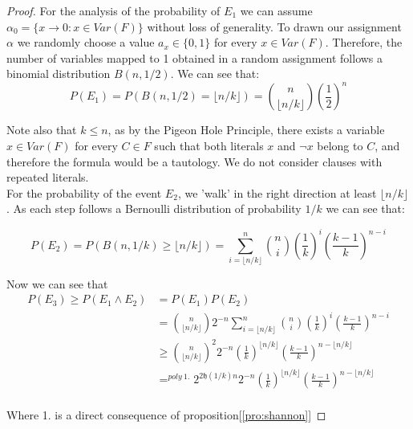 \begin{theorem}
\begin{proof}
For the analysis of the probability of $E_1$ we can assume $\alpha_0 = \{ x \to 0 : x \in Var(F)\}$ without loss of generality. To drawn our assignment $\alpha$ we randomly choose a value $a_x \in \{0,1\}$ for every $x \in Var(F)$. Therefore, the number of variables mapped to 1 obtained in a random assignment follows a binomial distribution $B(n, 1/2)$. We can see that:
$$P(E_1) = P(B(n,1/2) = \lfloor n/k\rfloor) = {\displaystyle {n \choose \lfloor n/k\rfloor }  \left (\frac{1}{2}\right )^{n}} $$

Note also that $k\le n$, as by the Pigeon Hole Principle, there exists a variable $x\in Var(F)$ for every $C\in F$ such that both literals $x$ and $\neg x$ belong to $C$, and therefore the formula would be a tautology. We do not consider clauses with repeated literals.\\

For the probability of the event $E_2$, we 'walk' in the right direction at least $\lfloor n/k\rfloor$. As each step follows a Bernoulli distribution of probability $1/k$ we can see that:

$$P(E_2) =  P(B(n,1/k) \ge \lfloor n/k\rfloor) = {\displaystyle \sum _{i=\lfloor n/k\rfloor }^{n}{n \choose i }  \left (\frac{1}{k}\right )^{i}  \left (\frac{k-1}{k}\right )^{n-i}} $$


Now we can see that
\begin{equation}
  \begin{split}
    P(E_3) \ge P(E_1 \land E_2)  & = P(E_1)P(E_2) \\
    & = {\displaystyle {n \choose \lfloor n/k\rfloor  }  2^{-n}} {\displaystyle \sum _{i=\lfloor n/k\rfloor }^{n}{n \choose i }  \left (\frac{1}{k}\right )^{i}  \left (\frac{k-1}{k}\right )^{n-i}}\\
    & \ge {\displaystyle {n \choose \lfloor n/k\rfloor  }^2  2^{-n}   \left (\frac{1}{k}\right )^{\lfloor n/k\rfloor}  \left (\frac{k-1}{k}\right )^{n-\lfloor n/k\rfloor}  } \\
    & =^{poly \ 1.} {\displaystyle 2^{2\mathfrak{h}(1/k) n}  2^{-n}   \left (\frac{1}{k}\right )^{\lfloor n/k\rfloor}  \left (\frac{k-1}{k}\right )^{n-\lfloor n/k\rfloor}  }\\
  \end{split}
\end{equation}

Where 1. is a direct consequence of proposition[\ref{pro:shannon}]


\end{proof}




\end{theorem}
